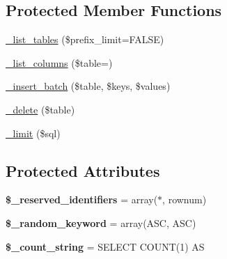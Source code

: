\subsection*{Protected Member Functions}
\begin{DoxyCompactItemize}
\item 
\mbox{\hyperlink{class_c_i___d_b__pdo__oci__driver_a1bb17d676f7b39f561e9f5cbe4c5952a}{\+\_\+list\+\_\+tables}} (\$prefix\+\_\+limit=F\+A\+L\+SE)
\item 
\mbox{\hyperlink{class_c_i___d_b__pdo__oci__driver_a872ef28aca2ad2cbc7ce9d0dbbf6c122}{\+\_\+list\+\_\+columns}} (\$table=\textquotesingle{}\textquotesingle{})
\item 
\mbox{\hyperlink{class_c_i___d_b__pdo__oci__driver_ac47963a5e7c08aa37e12c946a1c139d0}{\+\_\+insert\+\_\+batch}} (\$table, \$keys, \$values)
\item 
\mbox{\hyperlink{class_c_i___d_b__pdo__oci__driver_a94af30bb33c14525c6d52ca09712ac3d}{\+\_\+delete}} (\$table)
\item 
\mbox{\hyperlink{class_c_i___d_b__pdo__oci__driver_ab6780b4ca2fb9d9fc71e52a65bde3c23}{\+\_\+limit}} (\$sql)
\end{DoxyCompactItemize}
\subsection*{Protected Attributes}
\begin{DoxyCompactItemize}
\item 
\mbox{\label{class_c_i___d_b__pdo__oci__driver_ab5dbc3d7024e984da8164f71b1e01173}} 
{\bfseries \$\+\_\+reserved\+\_\+identifiers} = array(\textquotesingle{}$\ast$\textquotesingle{}, \textquotesingle{}rownum\textquotesingle{})
\item 
\mbox{\label{class_c_i___d_b__pdo__oci__driver_a77b4ff197c8aa20003b281ecd448f4de}} 
{\bfseries \$\+\_\+random\+\_\+keyword} = array(\textquotesingle{}A\+SC\textquotesingle{}, \textquotesingle{}A\+SC\textquotesingle{})
\item 
\mbox{\label{class_c_i___d_b__pdo__oci__driver_a95b362a85fba5c6bedfdb88d461cc6e9}} 
{\bfseries \$\+\_\+count\+\_\+string} = \textquotesingle{}S\+E\+L\+E\+CT C\+O\+U\+NT(1) AS \textquotesingle{}
\end{DoxyCompactItemize}



